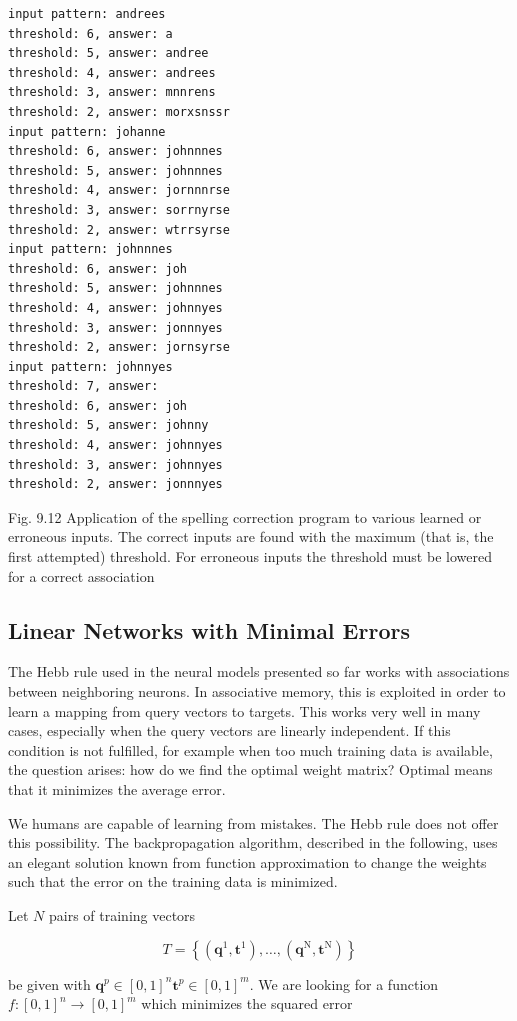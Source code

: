 \documentclass[10pt]{book}
\begin{document}
\begin{verbatim}
input pattern: andrees
threshold: 6, answer: a
threshold: 5, answer: andree
threshold: 4, answer: andrees
threshold: 3, answer: mnnrens
threshold: 2, answer: morxsnssr
input pattern: johanne
threshold: 6, answer: johnnnes
threshold: 5, answer: johnnnes
threshold: 4, answer: jornnnrse
threshold: 3, answer: sorrnyrse
threshold: 2, answer: wtrrsyrse
input pattern: johnnnes
threshold: 6, answer: joh
threshold: 5, answer: johnnnes
threshold: 4, answer: johnnyes
threshold: 3, answer: jonnnyes
threshold: 2, answer: jornsyrse
input pattern: johnnyes
threshold: 7, answer:
threshold: 6, answer: joh
threshold: 5, answer: johnny
threshold: 4, answer: johnnyes
threshold: 3, answer: johnnyes
threshold: 2, answer: jonnnyes
\end{verbatim}

Fig. 9.12 Application of the spelling correction program to various learned or erroneous inputs. The correct inputs are found with the maximum (that is, the first attempted) threshold. For erroneous inputs the threshold must be lowered for a correct association

\subsection*{Linear Networks with Minimal Errors}
The Hebb rule used in the neural models presented so far works with associations between neighboring neurons. In associative memory, this is exploited in order to learn a mapping from query vectors to targets. This works very well in many cases, especially when the query vectors are linearly independent. If this condition is not fulfilled, for example when too much training data is available, the question arises: how do we find the optimal weight matrix? Optimal means that it minimizes the average error.


We humans are capable of learning from mistakes. The Hebb rule does not offer this possibility. The backpropagation algorithm, described in the following, uses an elegant solution known from function approximation to change the weights such that the error on the training data is minimized.

Let $N$ pairs of training vectors

$$
T=\left\{\left(\boldsymbol{q}^{1}, \boldsymbol{t}^{1}\right), \ldots,\left(\boldsymbol{q}^{\mathrm{N}}, \boldsymbol{t}^{\mathrm{N}}\right)\right\}
$$

be given with $\boldsymbol{q}^{p} \in[0,1]^{n} \boldsymbol{t}^{p} \in[0,1]^{m}$. We are looking for a function $f:[0,1]^{n} \rightarrow [0,1]^{m}$ which minimizes the squared error
\end{document}
